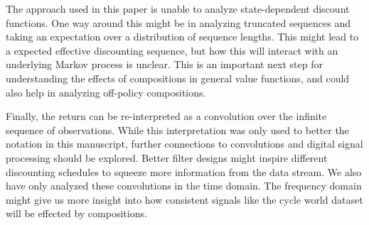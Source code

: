 \documentclass[11pt]{article} %
\begin{document}


The approach used in this paper is unable to analyze
state-dependent discount functions. One way around this might be in
analyzing truncated sequences and taking an expectation over a
distribution of sequence lengths. This might lead to a expected
effective discounting sequence, but how this will interact with an
underlying Markov process is unclear. This is an
important next step for understanding the effects of compositions in
general value functions, and could also help in analyzing off-policy
compositions.

Finally, the return can be re-interpreted as a
convolution over the infinite sequence of observations.
While this interpretation
was only used to better the notation in this manuscript, further connections to
convolutions and digital signal processing should be explored.
Better filter designs might inspire different discounting schedules to squeeze more information
from the data stream. We also have only analyzed these convolutions in
the time domain. The frequency domain might give us more insight
into how consistent signals like the cycle world dataset will be
effected by compositions. 




\vspace{-0.3cm}
\printbibliography
\end{document}
